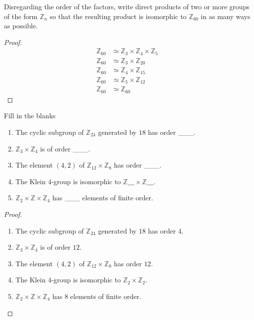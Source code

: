 \newpage
\begin{exercise}
    Disregarding the order of the factors, write direct products of two or more groups of the form $\mathbb{Z}_{n}$ so that the resulting product is isomorphic to $\mathbb{Z}_{60}$ in as many ways as possible.
\end{exercise}

\begin{proof}
    \begingroup
    \allowdisplaybreaks{}
    \begin{align*}
        \mathbb{Z}_{60} & \simeq \mathbb{Z}_{3}\times\mathbb{Z}_{4}\times\mathbb{Z}_{5} \\
        \mathbb{Z}_{60} & \simeq \mathbb{Z}_{3}\times\mathbb{Z}_{20}                    \\
        \mathbb{Z}_{60} & \simeq \mathbb{Z}_{4}\times\mathbb{Z}_{15}                    \\
        \mathbb{Z}_{60} & \simeq \mathbb{Z}_{5}\times\mathbb{Z}_{12}                    \\
        \mathbb{Z}_{60} & \simeq \mathbb{Z}_{60}
    \end{align*}
    \endgroup
\end{proof}

\newpage
\begin{exercise}
    Fill in the blanks
    \begin{enumerate}[label={\textbf{\alph*.}}]
        \item The cyclic subgroup of $\mathbb{Z}_{24}$ generated by $18$ has order \_\_\_.
        \item $\mathbb{Z}_{3}\times\mathbb{Z}_{4}$ is of order \_\_\_.
        \item The element $(4,2)$ of $\mathbb{Z}_{12}\times\mathbb{Z}_{8}$ has order \_\_\_.
        \item The Klein $4$-group is isomorphic to $\mathbb{Z}\_\_\_\times\mathbb{Z}\_\_\_$.
        \item $\mathbb{Z}_{2}\times\mathbb{Z}\times\mathbb{Z}_{4}$ has \_\_\_ elements of finite order.
    \end{enumerate}
\end{exercise}

\begin{proof}
    \begin{enumerate}[label={\textbf{\alph*.}}]
        \item The cyclic subgroup of $\mathbb{Z}_{24}$ generated by $18$ has order $4$.
        \item $\mathbb{Z}_{3}\times\mathbb{Z}_{4}$ is of order $12$.
        \item The element $(4,2)$ of $\mathbb{Z}_{12}\times\mathbb{Z}_{8}$ has order $12$.
        \item The Klein $4$-group is isomorphic to $\mathbb{Z}_{2}\times\mathbb{Z}_{2}$.
        \item $\mathbb{Z}_{2}\times\mathbb{Z}\times\mathbb{Z}_{4}$ has $8$ elements of finite order.
    \end{enumerate}
\end{proof}

